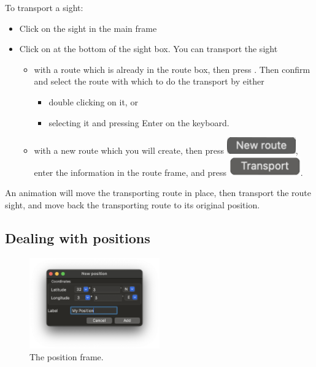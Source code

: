 \documentclass{ol-softwaremanual}
\begin{document}
To transport a sight: 
\begin{itemize}
\item Click on the sight in the main frame
\item Click on  at the bottom of the sight box. You can transport the sight
\begin{itemize}
\item with a route which is already in the route box, then press . Then confirm and select the route with which to do the transport by either
\begin{itemize}
  \item double clicking on it, or
  \item selecting it and pressing Enter on the keyboard. 
\end{itemize}
\item with a new route which you will create, then press \includegraphics{figures/new-route-button.png}, enter the information in the route frame, and press \includegraphics{figures/routeframe-transport-button.png}. 
\end{itemize}
\end{itemize}
An animation will move the transporting route in place, then transport the route sight, and move back the transporting route to its original position. 


\subsection{Dealing with positions}\label{section-position}

\begin{figure}
  \centering
  \includegraphics[width=0.5\textwidth]{figures/position-frame.png}
  \caption{
    \label{fig-position-frame}
    The position frame.  
  }
\end{figure}
\end{document}
